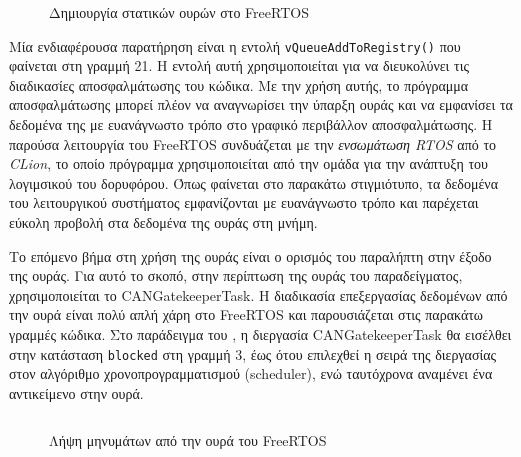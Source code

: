 \documentclass[a4paper,nobib,justified]{tufte-book}
\begin{document}
\begin{figure}[h]
	\inputminted{c++}{code/examples/gatekeeper-queue.cpp}
	\label{lst:gatekeeper-queue}
	\caption[Δημιουργία στατικών ουρών στο FreeRTOS]{Δημιουργία στατικών ουρών στο FreeRTOS}
\end{figure}
\FloatBarrier
\label{sec:queue-registry}
Μία ενδιαφέρουσα παρατήρηση είναι η εντολή \texttt{vQueueAddToRegistry()} που φαίνεται στη γραμμή 21. Η εντολή αυτή χρησιμοποιείται για να διευκολύνει τις διαδικασίες αποσφαλμάτωσης του κώδικα. Με την χρήση αυτής, το πρόγραμμα αποσφαλμάτωσης μπορεί πλέον να αναγνωρίσει την ύπαρξη ουράς και να εμφανίσει τα δεδομένα της με ευανάγνωστο τρόπο στο γραφικό περιβάλλον αποσφαλμάτωσης. Η παρούσα λειτουργία του FreeRTOS συνδυάζεται με την \emph{ενσωμάτωση RTOS} από το \emph{CLion}, το οποίο πρόγραμμα χρησιμοποιείται από την ομάδα για την ανάπτυξη του λογιμσικού του δορυφόρου. Όπως φαίνεται στο παρακάτω στιγμιότυπο, τα δεδομένα του λειτουργικού συστήματος εμφανίζονται με ευανάγνωστο τρόπο και παρέχεται εύκολη προβολή στα δεδομένα της ουράς στη μνήμη. 

Το επόμενο βήμα στη χρήση της ουράς είναι ο ορισμός του παραλήπτη στην έξοδο της ουράς. Για αυτό το σκοπό, στην περίπτωση της ουράς του παραδείγματος, χρησιμοποιείται το CANGatekeeperTask. Η διαδικασία επεξεργασίας δεδομένων από την ουρά είναι πολύ απλή χάρη στο FreeRTOS και παρουσιάζεται στις παρακάτω γραμμές κώδικα. Στο παράδειγμα του , η διεργασία CANGatekeeperTask θα εισέλθει στην κατάσταση \texttt{blocked} στη γραμμή 3, έως ότου επιλεχθεί η σειρά της διεργασίας στον αλγόριθμο χρονοπρογραμματισμού (scheduler), ενώ ταυτόχρονα αναμένει ένα αντικείμενο στην ουρά.
\begin{figure}
	\inputminted{c++}{code/examples/gatekeeper-execute-short.cpp}
	\label{code:gatekeeper-execute-short}
	\caption[Λήψη μηνυμάτων από την ουρά του FreeRTOS]{Λήψη μηνυμάτων από την ουρά του FreeRTOS}
\end{figure}
\end{document}
